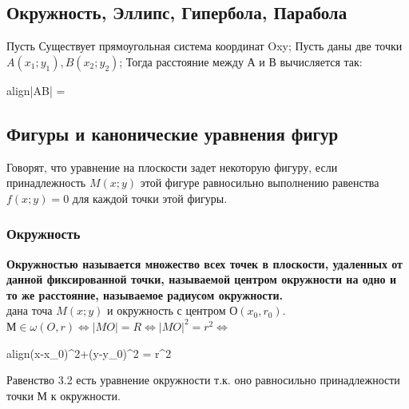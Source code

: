 \documentclass[oneside]{book}
\newcommand{\boxedeq}[2]{\begin{empheq}[box={\fboxsep=6pt\fbox}]{align}\label{#1}#2\end{empheq}}
\begin{document}
\begin{enumerate}
\chapter[Плоские фигуры\\]{Окружность, Эллипс, Гипербола, Парабола}
Пусть Существует прямоугольная система координат Oxy; Пусть даны две точки $A(x_1; y_1), B(x_2; y_2)$;
Тогда расстояние между А и В вычисляется так: \boxedeq{eq:*}{|AB| = }

\section[Уравнения фигур]{Фигуры и канонические уравнения фигур}
Говорят, что уравнение на плоскости задет некоторую фигуру, если принадлежность $M(x; y)$ этой фигуре равносильно
выполнению равенства $f(x; y) = 0$ для каждой точки этой фигуры.

\subsection{Окружность}
\textbf{Окружностью называется множество всех точек в плоскости, удаленных от данной фиксированной точки, называемой
центром окружности на одно и то же расстояние, называемое радиусом окружности.} \\
дана точа $M(x; y)$ и окружность с центром О$(x_0, r_0)$. $М \in \omega(O, r) \Leftrightarrow |MO|=R \Leftrightarrow
|MO|^2 = r^2 \Leftrightarrow$ \boxedeq{eq:*}{(x-x_0)^2+(y-y_0)^2 = r^2}
Равенство 3.2 есть уравнение окружности т.к. оно равносильно принадлежности точки М к окружности.


\end{enumerate}
\end{document}
